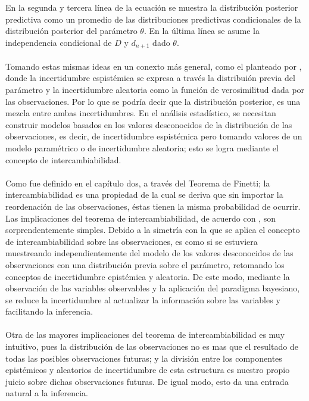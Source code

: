 En la segunda y tercera l\'inea de la ecuaci\'on se muestra la distribuci\'on posterior predictiva como un promedio de las distribuciones predictivas condicionales de la distribuci\'on posterior del par\'ametro $\theta$. En la \'ultima l\'inea se asume la independencia condicional de $D$ y $d_{n+1}$ dado $\theta$.\\
\\
Tomando estas mismas ideas en un conexto m\'as general, como el planteado por \cite{goldstein2013observables}, donde la incertidumbre espist\'emica se expresa a trav\'es la distribui\'on previa del par\'ametro y la incertidumbre aleatoria como la funci\'on de verosimilitud dada por las observaciones. Por lo que se podr\'ia decir que la distribuci\'on posterior, es una mezcla entre ambas incertidumbres. En el an\'alisis estad\'istico, se necesitan construir modelos basados en los valores desconocidos de la distribuci\'on de las observaciones, es decir, de incertidumbre espist\'emica pero tomando valores de un modelo param\'etrico o de incertidumbre aleatoria; esto se logra mediante el concepto de intercambiabilidad.\\
\\
Como fue definido en el cap\'itulo dos, a trav\'es del Teorema de Finetti; la intercambiabilidad es una propiedad de la cual se deriva que sin importar la reordenaci\'on de las observaciones, \'estas tienen la misma probabilidad de ocurrir. Las implicaciones del teorema de intercambiabilidad, de acuerdo con \cite{goldstein2013observables}, son sorprendentemente simples. Debido a la simetr\'ia con la que se aplica el concepto de intercambiabilidad sobre las observaciones, es como si se estuviera muestreando independientemente del modelo de los valores desconocidos de las observaciones con una distribuci\'on previa sobre el par\'ametro, retomando los conceptos de incertidumbre epist\'emica y aleatoria. De este modo, mediante la observaci\'on de las variables observables y la aplicaci\'on del paradigma bayesiano, se reduce la incertidumbre al actualizar la informaci\'on sobre las variables y facilitando la inferencia.\\
\\
Otra de las mayores implicaciones del teorema de intercambiabilidad es muy intuitivo, pues la distribuci\'on de las observaciones no es mas que el resultado de todas las posibles observaciones futuras; y la divisi\'on entre los componentes epist\'emicos y aleatorios de incertidumbre de esta estructura es nuestro propio juicio sobre dichas observaciones futuras. De igual modo, esto da una entrada natural a la inferencia.\\
